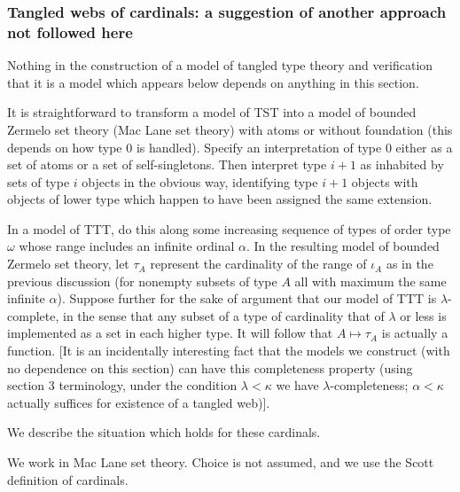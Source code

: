 \documentclass[112pt]{article}
\theoremstyle{definition}
\theoremstyle{remark}
\begin{document}
\newpage

\subsubsection{Tangled webs of cardinals:  a suggestion of another approach not followed here}

Nothing in the construction of a model of tangled type theory and verification that it is a model which appears below depends on anything in this section.

It is straightforward to transform a model of TST into a model of bounded Zermelo set theory (Mac Lane set theory) with atoms or without foundation
(this depends on how type 0 is handled).  Specify an interpretation of type 0 either as a set of atoms or a set of self-singletons.  Then interpret
type $i+1$ as inhabited by sets of type $i$ objects in the obvious way, identifying type $i+1$ objects with objects of lower type which happen to have been assigned the same extension.

In a model of TTT, do this along some increasing sequence of types of order type $\omega$ whose range includes an infinite ordinal $\alpha$.  In the resulting model of bounded Zermelo set theory,
let $\tau_A$ represent the cardinality of the range of $\iota_A$ as in the previous discussion (for nonempty subsets of type $A$ all with maximum the same infinite $\alpha$).  Suppose further for the sake of argument that our model of TTT is $\lambda$-complete, in the sense that any subset of a type of cardinality that of $\lambda$ or less is implemented as a set in each higher type.
It will follow that $A \mapsto \tau_A$ is actually a function. [It is an incidentally interesting fact that the models we construct (with no dependence on this section) can have this completeness property (using section 3 terminology, under the condition $\lambda<\kappa$ we have $\lambda$-completeness; $\alpha<\kappa$ actually suffices for existence of a tangled web)].

We describe the situation which holds for these cardinals.

We work in Mac Lane set theory.  Choice is not assumed, and we use the Scott definition of cardinals.
\end{document}

